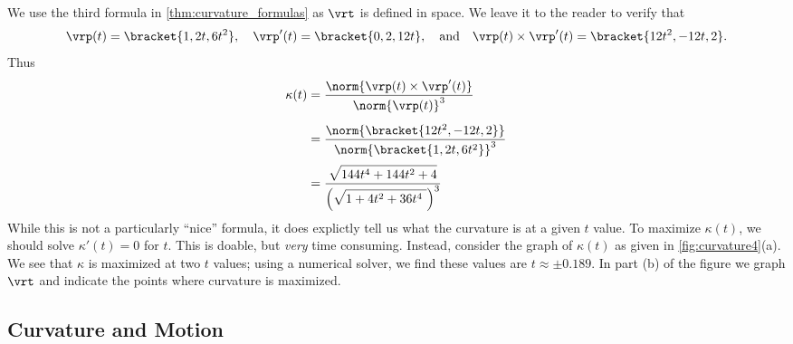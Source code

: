 {We use the third formula in \autoref{thm:curvature_formulas} as $\vrt$ is defined in space. We leave it to the reader to verify that 
$$\vrp(t) =\bracket{1,2t,6t^2},\quad \vrp'(t) =\bracket{0,2,12t},\quad \text{and}\quad \vrp(t)\times \vrp'(t) =\bracket{12t^2,-12t,2}.$$
Thus 
\begin{align*}
\kappa(t) &= \frac{\norm{\vrp(t)\times\vrp'(t)}}{\norm{\vrp(t)}^3} \\
				&= \rule{0pt}{20pt}\frac{\norm{\bracket{12t^2,-12t,2}}}{\norm{\bracket{1,2t,6t^2}}^3} \\
				&= \rule{0pt}{20pt}\frac{\sqrt{\rule{0pt}{8.5pt}144t^4+144t^2+4}}{\left(\sqrt{\rule{0pt}{8.5pt}1+4t^2+36t^4\ }\right)^3}
\end{align*}
While this is not a particularly ``nice'' formula, it does explictly tell us what the curvature is at a given $t$ value. To maximize $\kappa(t)$, we should solve $\kappa'(t)=0$ for $t$. This is doable, but \emph{very} time consuming. Instead, consider the graph of $\kappa(t)$ as given in \autoref{fig:curvature4}(a). We see that $\kappa$ is maximized at two $t$ values; using a numerical solver, we find these values are $t\approx\pm 0.189$. In part (b) of the figure we graph $\vrt$ and indicate the points where curvature is maximized.}

\subsection*{Curvature and Motion}

